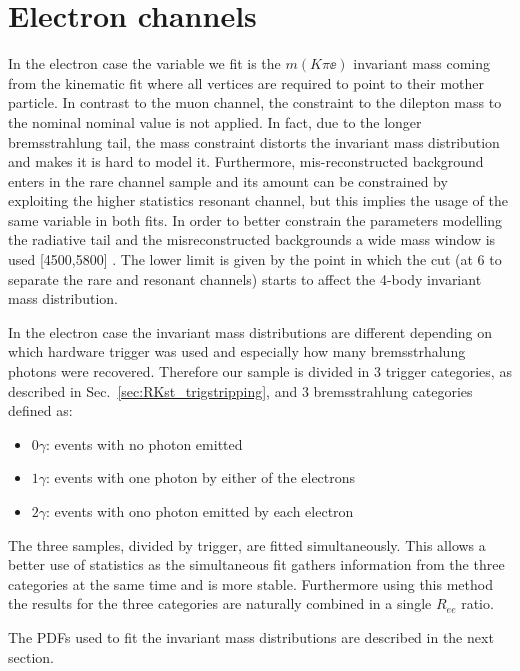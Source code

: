 \section{Electron channels}
\label{sec:RKst_fit_ee}

In the electron case the variable we fit is the $m(K\pi\ee)$ invariant mass coming from the kinematic
fit where all vertices are required to point to their mother particle. 
In contrast to the muon channel,
the constraint to the dilepton mass to the nominal \jpsi nominal value is not applied.
In fact, due to the longer bremsstrahlung tail, the \jpsi mass constraint distorts the invariant mass distribution
and makes it is hard to model it. Furthermore, mis-reconstructed background enters in the rare channel sample and
its amount can be constrained by exploiting the higher statistics resonant channel, but this implies
the usage of the same variable in both fits.
In order to better constrain the parameters modelling the radiative tail and the misreconstructed
backgrounds a wide mass window is used [4500,5800] \mevcc. The lower limit is given
by the point in which the \qsq cut (at 6 \gevgevcccc to separate the rare and resonant channels)
starts to affect the 4-body invariant mass distribution.

In the electron case the invariant mass distributions are different depending on which hardware
trigger was used and especially how many bremsstrhalung photons were recovered.
Therefore our sample is divided in 3 trigger categories, as described in
Sec.~\ref{sec:RKst_trigstripping}, and 3 bremsstrahlung categories defined as:
%
\begin{itemize}
\item $0\gamma$: events with no photon emitted
\item $1\gamma$: events with one photon by either of the electrons
\item $2\gamma$: events with ono photon emitted by each electron
\end{itemize}
%
The three samples, divided by trigger, are fitted simultaneously.
This allows a better use of statistics as the simultaneous fit
gathers information from the three categories at the same time and is more stable.
Furthermore using this method the results for the three categories are
naturally combined in a single $R_{ee}$ ratio.

The PDFs used to fit the invariant mass distributions are described in the next section.



